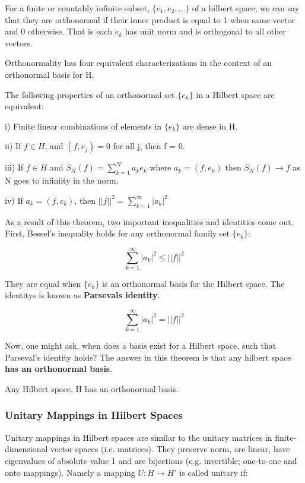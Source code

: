 \documentclass[class=article, crop=false]{standalone}
\begin{document}
			For a finite or countably infinite subset, $\{e_1, e_2, ...\}$ of a hilbert space, we can say that they are orthonormal if their inner product is equal to 1 when same vector and 0 otherwise. That is each $e_k$ has unit norm and is orthogonal to all other vectors. 

			Orthonormality has four equivalent characterizations in the context of an orthonormal basis for H.

			\begin{theorem} 
				The following properties of an orthonormal set $\{e_k\}$ in a Hilbert space are equivalent:

				i) Finite linear combinations of elements in $\{e_k\}$ are dense in H.
				
				ii) If $f \in H$, and $(f, e_j) = 0$ for all j, then f = 0.

				iii) If $f \in H$ and $S_N(f) = \sum_{k=1}^N a_k e_k$ where $a_k = (f, e_k)$ then $S_N(f) \rightarrow f$ as N goes to infiniity in the norm.

				iv) If $a_k = (f, e_k)$, then $||f||^2 = \sum_{k=1}^\infty |a_k|^2$
			\end{theorem}

			As a result of this theorem, two important inequalities and identities come out. First, Bessel's inequality holds for any orthonormal family set $\{e_k\}$:

				$$\sum_{k=1}^\infty |a_k|^2 \le ||f||^2$$

			They are equal when $\{e_k\}$ is an orthonormal basis for the Hilbert space. The identitys is known as \textbf{Parsevals identity}.

				$$\sum_{k=1}^\infty |a_k|^2 = ||f||^2$$

			Now, one might ask, when does a basis exist for a Hilbert space, such that Parseval's identity holds? The answer in this theorem is that any hilbert space \textbf{has an orthonormal basis}.

			\begin{theorem} 
				Any Hilbert space, H has an orthonormal basis.
			\end{theorem}

		\subsubsection{Unitary Mappings in Hilbert Spaces}
			Unitary mappings in Hilbert spaces are similar to the unitary matrices in finite-dimensional vector spaces (i.e. matrices). They preserve norm, are linear, have eigenvalues of absolute value 1 and are bijections (e.g. invertible; one-to-one and onto mappings). Namely a mapping $U: H \rightarrow H'$ is called unitary if:
\end{document}
